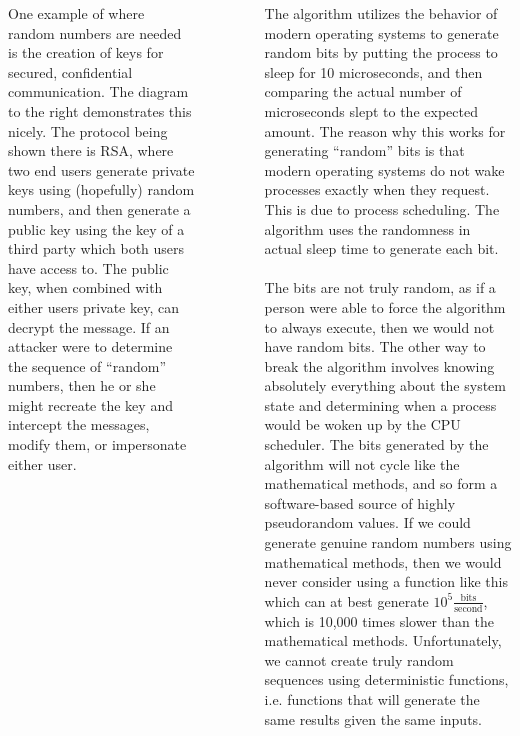 \documentclass[24pt, landscape]{tikzposter}
\begin{document}
\begin{columns}
{\begin{minipage}{0.35\textwidth}
One example of where random numbers are needed is the creation of keys for secured, confidential communication. The diagram to the right demonstrates this nicely. The protocol being shown there is RSA, where two end users generate private keys using (hopefully) random numbers, and then generate a public key using the key of a third party which both users have access to. The public key, when combined with either users private key, can decrypt the message. If an attacker were to determine the sequence of ``random'' numbers, then he or she might recreate the key and intercept the messages, modify them, or impersonate either user.
\end{minipage}
\begin{minipage}{0.35\textwidth}\
\begin{center}
\end{center}
\end{minipage}
	}
{
The algorithm utilizes the behavior of modern operating systems to generate random bits by putting the process to sleep for 10 microseconds, and then comparing the actual number of microseconds slept to the expected amount. The reason why this works for generating ``random'' bits is that modern operating systems do not wake processes exactly when they request. This is due to process scheduling. The algorithm uses the randomness in actual sleep time to generate each bit. 
\\
\\
The bits are not truly random, as if a person were able to force the algorithm to always execute, then we would not have random bits. The other way to break the algorithm involves knowing absolutely everything about the system state and determining when a process would be woken up by the CPU scheduler. The bits generated by the algorithm will not cycle like the mathematical methods, and so form a software-based source of highly pseudorandom values. If we could generate genuine random numbers using mathematical methods, then we would never consider using a function like this which can at best generate $10^5 \frac{\mathrm{bits}}{\mathrm{second}}$, which is 10,000 times slower than the mathematical methods. Unfortunately, we cannot create truly random sequences using deterministic functions, i.e. functions that will generate the same results given the same inputs.
}
\end{columns}
\end{document}
